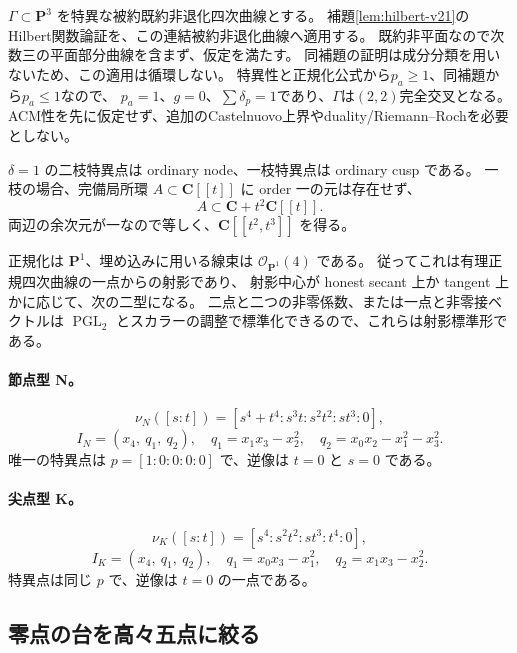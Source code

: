 \documentclass[11pt,a4paper]{ltjsarticle}
\newcommand{\CC}{\mathbf C}\newcommand{\QQ}{\mathbf Q}
\newcommand{\PP}{\mathbf P}\renewcommand{\AA}{\mathbf A}
\newcommand{\OO}{\mathcal O}\newcommand{\FF}{\mathcal F}
\DeclareMathOperator{\PGL}{PGL}\DeclareMathOperator{\GL}{GL}
\theoremstyle{remark}\newtheorem{remark}[theorem]{注意}
\begin{document}
$\Gamma\subset\PP^3$ を特異な被約既約非退化四次曲線とする。
補題\ref{lem:hilbert-v21}のHilbert関数論証を、この連結被約非退化曲線へ適用する。
既約非平面なので次数三の平面部分曲線を含まず、仮定を満たす。
同補題の証明は成分分類を用いないため、この適用は循環しない。
特異性と正規化公式から$p_a\ge1$、同補題から$p_a\le1$なので、
$p_a=1$、$g=0$、$\sum\delta_p=1$であり、$\Gamma$は$(2,2)$完全交叉となる。
ACM性を先に仮定せず、追加のCastelnuovo上界やduality/Riemann--Rochを必要としない。

$\delta=1$ の二枝特異点は ordinary node、一枝特異点は ordinary cusp である。
一枝の場合、完備局所環 $A\subset\CC[[t]]$ に order 一の元は存在せず、
\[
A\subset\CC+t^2\CC[[t]].
\]
両辺の余次元が一なので等しく、$\CC[[t^2,t^3]]$ を得る。

正規化は $\PP^1$、埋め込みに用いる線束は $\OO_{\PP^1}(4)$ である。
従ってこれは有理正規四次曲線の一点からの射影であり、
射影中心が honest secant 上か tangent 上かに応じて、次の二型になる。
二点と二つの非零係数、または一点と非零接ベクトルは
$\PGL_2$ とスカラーの調整で標準化できるので、これらは射影標準形である。

\paragraph{節点型 N。}
\[
\nu_N([s:t])=[s^4+t^4:s^3t:s^2t^2:st^3:0],
\]
\[
I_N=(x_4,\ q_1,\ q_2),\quad
q_1=x_1x_3-x_2^2,\quad q_2=x_0x_2-x_1^2-x_3^2.
\]
唯一の特異点は $p=[1:0:0:0:0]$ で、逆像は $t=0$ と $s=0$ である。

\paragraph{尖点型 K。}
\[
\nu_K([s:t])=[s^4:s^2t^2:st^3:t^4:0],
\]
\[
I_K=(x_4,\ q_1,\ q_2),\quad
q_1=x_0x_3-x_1^2,\quad q_2=x_1x_3-x_2^2.
\]
特異点は同じ $p$ で、逆像は $t=0$ の一点である。

\subsection{零点の台を高々五点に絞る}
\end{document}
